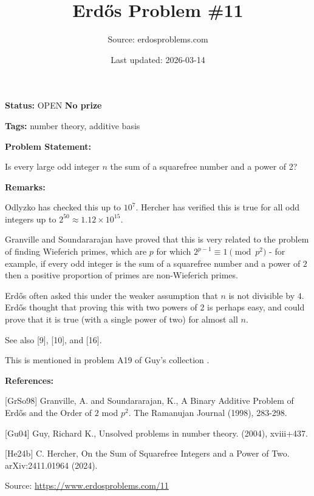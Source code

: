 \documentclass{article}
\title{Erd\H{o}s Problem \#11}
\date{Last updated: 2026-03-14}
\author{Source: erdosproblems.com}
\begin{document}
\maketitle

\noindent\textbf{Status:} OPEN \quad \textbf{No prize}

\noindent\textbf{Tags:} number theory, additive basis

\medskip
\noindent\textbf{Problem Statement:}

Is every large odd integer $n$ the sum of a squarefree number and a power of 2?

\bigskip
\noindent\textbf{Remarks:}

Odlyzko has checked this up to $10^7$. Hercher \cite{He24b} has verified this is true for all odd integers up to $2^{50}\approx 1.12\times 10^{15}$.

Granville and Soundararajan \cite{GrSo98} have proved that this is very related to the problem of finding Wieferich primes, which are $p$ for which $2^{p-1}\equiv 1\pmod{p^2}$ - for example, if every odd integer is the sum of a squarefree number and a power of $2$ then a positive proportion of primes are non-Wieferich primes.

Erd\H{o}s often asked this under the weaker assumption that $n$ is not divisible by $4$. Erd\H{o}s thought that proving this with two powers of 2 is perhaps easy, and could prove that it is true (with a single power of two) for almost all $n$.

See also [9], [10], and [16].

This is mentioned in problem A19 of Guy's collection \cite{Gu04}.

\bigskip
\noindent\textbf{References:}

[GrSo98] Granville, A. and Soundararajan, K., A Binary Additive Problem of Erd\H{o}s and the Order of $2$ mod $p^2$. The Ramanujan Journal (1998), 283-298.
 
 [Gu04] Guy, Richard K., Unsolved problems in number theory. (2004), xviii+437.
 
 [He24b] C. Hercher, On the Sum of Squarefree Integers and a Power of Two. arXiv:2411.01964 (2024).

\bigskip
\noindent\small{Source: \url{https://www.erdosproblems.com/11}}
\end{document}
